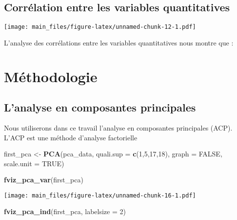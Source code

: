 \documentclass[14pt,]{article}
\newenvironment{Shaded}{\begin{snugshade}}{\end{snugshade}}
\newcommand{\DataTypeTok}[1]{\textcolor[rgb]{0.13,0.29,0.53}{#1}}
\newcommand{\DecValTok}[1]{\textcolor[rgb]{0.00,0.00,0.81}{#1}}
\newcommand{\KeywordTok}[1]{\textcolor[rgb]{0.13,0.29,0.53}{\textbf{#1}}}
\newcommand{\NormalTok}[1]{#1}
\newcommand{\OtherTok}[1]{\textcolor[rgb]{0.56,0.35,0.01}{#1}}
\newcommand{\StringTok}[1]{\textcolor[rgb]{0.31,0.60,0.02}{#1}}
\begin{document}
\hypertarget{corruxe9lation-entre-les-variables-quantitatives}{%
\subsection{Corrélation entre les variables
quantitatives}\label{corruxe9lation-entre-les-variables-quantitatives}}

\texttt{[image: main\_files/figure-latex/unnamed-chunk-12-1.pdf]}

L'analyse des corrélations entre les variables quantitatives nous montre
que :

\hypertarget{muxe9thodologie}{%
\section{Méthodologie}\label{muxe9thodologie}}

\hypertarget{lanalyse-en-composantes-principales}{%
\subsection{L'analyse en composantes
principales}\label{lanalyse-en-composantes-principales}}

Nous utiliserons dans ce travail l'analyse en composantes principales
(ACP). L'ACP est une méthode d'analyse factorielle

\begin{Shaded}
\begin{Highlighting}[]
\NormalTok{first_pca <-}\StringTok{ }\KeywordTok{PCA}\NormalTok{(pca_data, }\DataTypeTok{quali.sup =} \KeywordTok{c}\NormalTok{(}\DecValTok{1}\NormalTok{,}\DecValTok{5}\NormalTok{,}\DecValTok{17}\NormalTok{,}\DecValTok{18}\NormalTok{), }\DataTypeTok{graph =} \OtherTok{FALSE}\NormalTok{, }\DataTypeTok{scale.unit =} \OtherTok{TRUE}\NormalTok{)}
\end{Highlighting}
\end{Shaded}

\begin{Shaded}
\begin{Highlighting}[]
\KeywordTok{fviz_pca_var}\NormalTok{(first_pca)}
\end{Highlighting}
\end{Shaded}

\texttt{[image: main\_files/figure-latex/unnamed-chunk-16-1.pdf]}

\begin{Shaded}
\begin{Highlighting}[]
\KeywordTok{fviz_pca_ind}\NormalTok{(first_pca, }\DataTypeTok{labelsize =} \DecValTok{2}\NormalTok{)}
\end{Highlighting}
\end{Shaded}
\end{document}
